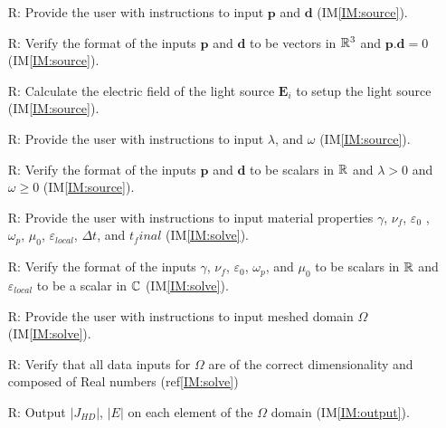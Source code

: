 \documentclass[12pt]{article}
\newcounter{reqnum} %
\begin{document}
\noindent \begin{itemize}

\item[R\refstepcounter{reqnum}\thereqnum \label{R_source}:] Provide the user with instructions to input $\textbf{p}$ and $\textbf{d}$ (IM\ref{IM:source}).

\item[R\refstepcounter{reqnum}\thereqnum \label{R_sourcecheck}:] Verify the format of the inputs $\textbf{p}$ and $\textbf{d}$ to be vectors in $\Bbb R^3$ and $\textbf{p}\textbf{.}\textbf{d}=0$ (IM\ref{IM:source}).

\item[R\refstepcounter{reqnum}\thereqnum \label{R_source}:] Calculate the electric field of the light source $\textbf{E}_i$ to setup the light source (IM\ref{IM:source}).

\item[R\refstepcounter{reqnum}\thereqnum \label{R_source}:] Provide the user with instructions to input $\lambda$, and $\omega$ (IM\ref{IM:source}).

\item[R\refstepcounter{reqnum}\thereqnum \label{R_sourcecheck}:] Verify the format of the inputs $\textbf{p}$ and $\textbf{d}$ to be scalars in $\Bbb R$ and $\lambda>0$ and $\omega \geqslant0$ (IM\ref{IM:source}).

\item[R\refstepcounter{reqnum}\thereqnum \label{R_materialprop}:] Provide the user with instructions to input material properties $\gamma$, $\nu_f$, $\varepsilon_0$ , $\omega_p$, $\mu_{0}$, $\varepsilon_{local}$, $\Delta t$, and $t_final$ (IM\ref{IM:solve}).

\item[R\refstepcounter{reqnum}\thereqnum \label{R_materialpropcheck}:] Verify the format of the inputs $\gamma$, $\nu_f$, $\varepsilon_0$, $\omega_p$, and $\mu_{0}$ to be scalars in $\Bbb R$ and $\varepsilon_{local}$ to be a scalar in $\Bbb C$ (IM\ref{IM:solve}).
 
\item[R\refstepcounter{reqnum}\thereqnum \label{R_Output}:] Provide the user with instructions to input meshed domain $\Omega$ (IM\ref{IM:solve}).

\item[R\refstepcounter{reqnum}\thereqnum \label{R_Output}:] Verify that all data inputs for $\Omega$ are of the correct dimensionality and composed of Real numbers (ref\ref{IM:solve})


\item[R\refstepcounter{reqnum}\thereqnum \label{R_Output}:] Output $|J_{HD}|$, $|E|$ on each element of the $\Omega$ domain (IM\ref{IM:output}).
 

\end{itemize}
\end{document}
